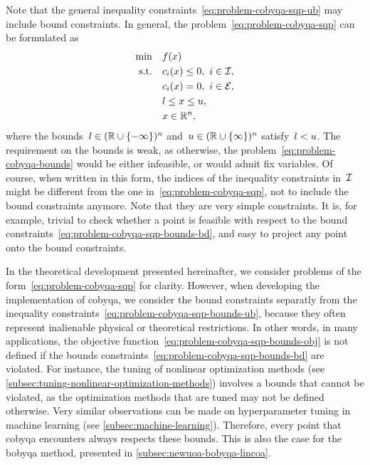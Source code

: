 Note that the general inequality constraints~\cref{eq:problem-cobyqa-sqp-ub} may include bound constraints.
In general, the problem~\cref{eq:problem-cobyqa-sqp} can be formulated as
\begin{subequations}
    \label{eq:problem-cobyqa-bounds}
    \begin{align}
        \min        & \quad \obj(\iter) \label{eq:problem-cobyqa-bounds-obj}\\
        \text{s.t.} & \quad \con{i}(\iter) \le 0, ~ i \in \iub, \label{eq:problem-cobyqa-bounds-ub}\\
                    & \quad \con{i}(\iter) = 0, ~ i \in \ieq,\\
                    & \quad \xl \le x \le \xu, \label{eq:problem-cobyqa-bounds-bd}\\
                    & \quad \iter \in \R^n, \nonumber
    \end{align}
\end{subequations}
where the bounds~$l \in (\mathbb{R} \cup \{-\infty\})^n$ and~$u \in (\mathbb{R} \cup \{\infty\})^n$ satisfy~$l < u$.
The requirement on the bounds is weak, as otherwise, the problem~\cref{eq:problem-cobyqa-bounds} would be either infeasible, or would admit fix variables.
Of course, when written in this form, the indices of the inequality constraints in~$\mathcal{I}$ might be different from the one in~\cref{eq:problem-cobyqa-sqp}, not to include the bound constraints anymore.
Note that they are very simple constraints.
It is, for example, trivial to check whether a point is feasible with respect to the bound constraints~\cref{eq:problem-cobyqa-sqp-bounds-bd}, and easy to project any point onto the bound constraints.

In the theoretical development presented hereinafter, we consider problems of the form~\cref{eq:problem-cobyqa-sqp} for clarity.
However, when developing the implementation of \gls{cobyqa}, we consider the bound constraints separatly from the inequality constraints~\cref{eq:problem-cobyqa-sqp-bounds-ub}, because they often represent inalienable physical or theoretical restrictions.
In other words, in many applications, the objective function~\cref{eq:problem-cobyqa-sqp-bounds-obj} is not defined if the bounds constraints~\cref{eq:problem-cobyqa-sqp-bounds-bd} are violated.
For instance, the tuning of nonlinear optimization methods (see \cref{subsec:tuning-nonlinear-optimization-methods}) involves a bounds that cannot be violated, as the optimization methods that are tuned may not be defined otherwise.
Very similar observations can be made on hyperparameter tuning in machine learning (see \cref{subsec:machine-learning}).
Therefore, every point that \gls{cobyqa} encounters always respects these bounds.
This is also the case for the \gls{bobyqa} method, presented in \cref{subsec:newuoa-bobyqa-lincoa}.

